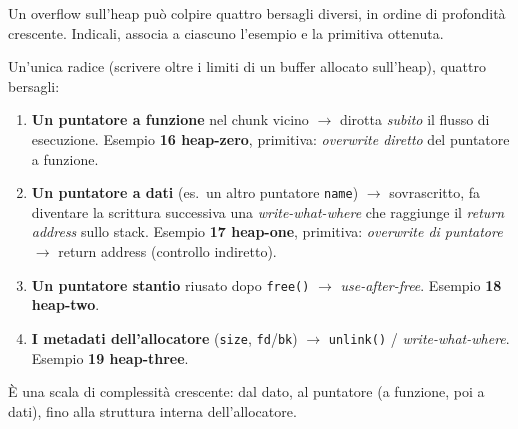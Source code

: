 \question[6]
Un overflow sull'heap può colpire quattro bersagli diversi, in ordine di profondità crescente. Indicali, associa a ciascuno l'esempio e la primitiva ottenuta.
\begin{solution}
Un'unica radice (scrivere oltre i limiti di un buffer allocato sull'heap), quattro bersagli:
\begin{enumerate}[leftmargin=*,nosep]
  \item \textbf{Un puntatore a funzione} nel chunk vicino $\to$ dirotta \emph{subito} il flusso di esecuzione. Esempio \textbf{16 heap-zero}, primitiva: \emph{overwrite diretto} del puntatore a funzione.
  \item \textbf{Un puntatore a dati} (es.\ un altro puntatore \lstinline|name|) $\to$ sovrascritto, fa diventare la scrittura successiva una \emph{write-what-where} che raggiunge il \emph{return address} sullo stack. Esempio \textbf{17 heap-one}, primitiva: \emph{overwrite di puntatore} $\to$ return address (controllo indiretto).
  \item \textbf{Un puntatore stantio} riusato dopo \lstinline|free()| $\to$ \emph{use-after-free}. Esempio \textbf{18 heap-two}.
  \item \textbf{I metadati dell'allocatore} (\lstinline|size|, \lstinline|fd|/\lstinline|bk|) $\to$ \lstinline|unlink()| / \emph{write-what-where}. Esempio \textbf{19 heap-three}.
\end{enumerate}
È una scala di complessità crescente: dal dato, al puntatore (a funzione, poi a dati), fino alla struttura interna dell'allocatore.
\end{solution}
